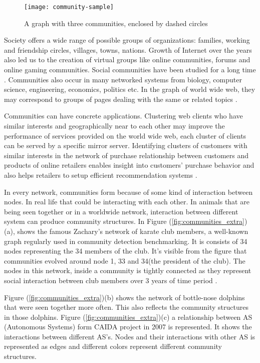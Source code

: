 \vfill
\pagebreak

\begin{figure}[H]
	\centering
	\texttt{[image: community-sample]}
	\caption{A graph with three communities, enclosed by dashed circles}
	\label{fig:a_sample_community}
\end{figure}

Society offers a wide range of possible groups of organizations: families, working and friendship circles, villages, towns, nations. Growth of Internet over the years also led us to the creation of virtual groups like online communities, forums and online gaming communities. Social communities have been studied for a long time \cite{ref-6}. Communities also occur in many networked systems from biology, computer science, engineering, economics, politics etc. In the graph of world wide web, they may correspond to groups of pages dealing with the same or related topics \cite{ref-36}.

Communities can have concrete applications. Clustering web clients who have similar interests and geographically near to each other may improve the performance of services provided on the world wide web, each cluster of clients can be served by a specific mirror server. Identifying clusters of customers with similar interests in the network of purchase relationship between customers and products of online retailers enables insight into customers' purchase behavior and also helps retailers to setup efficient recommendation systems \cite{ref-37}.

In every network, communities form because of some kind of interaction between nodes. In real life that could be interacting with each other. In animals that are being seen together or in a worldwide network, interaction between different system can produce community structures. In Figure (\ref{fig:communities_extra})(a), shows the famous Zachary's network of karate club members, a well-known graph regularly used in community detection benchmarking. It is consists of 34 nodes representing the 34 members of the club. It's visible from the figure that communities evolved around node 1, 33 and 34(the president of the club). The nodes in this network, inside a community is tightly connected as they represent social interaction between club members over 3 years of time period \cite{ref-58}.

Figure (\ref{fig:communities_extra})(b) shows the network of bottle-nose dolphins that were seen together more often. This also reflects the community structures in those dolphins. Figure (\ref{fig:communities_extra})(c) a relationship between AS (Autonomous Systems) form CAIDA project in 2007 is represented. It shows the interactions between different AS's. Nodes and their interactions with other AS is represented as edges and different colors represent different community structures.

